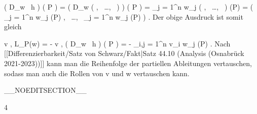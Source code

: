 {\mavergleichskettealignhandlinks
{\vergleichskettealignhandlinks
{ \left(  D_{w}
 \,  h   \right) \left(   P   \right)
}
{ =} { \left(  D_{w}  \left(  {  }   , \,   \ldots  , \,   {  }                 \right)    \right) \left(   P   \right)
}
{ =} { \sum_{j = 1}^n  w_j  {  }  \left(  {  }   , \,   \ldots  , \,   {  }                 \right) (P)
}
{ =} { \left(  \sum_{j = 1}^n  w_j  {  }  {  } (P)   , \,   \ldots  , \,   \sum_{j = 1}^n  w_j  {  }  {  } (P)                 \right)
}
{ } {
}
}
{}
{}{.}
Der obige Ausdruck ist somit gleich

\mavergleichskettealign
{\vergleichskettealign
{ \left\langle  v  ,  L_P(w)  \right\rangle
}
{ =} { - {  } \left\langle  v  ,  \left(  D_{w}
 \,  h   \right) \left(   P   \right)   \right\rangle
}
{ =} { -  {  }  \sum_{i,j = 1}^n v_i  w_j  {  } {  }  (P)
}
{ } {
}
{ } {
}
}
{}
{}{.}
Nach
[[Differenzierbarkeit/Satz von Schwarz/Fakt|Satz 44.10 (Analysis (Osnabrück 2021-2023))]]
kann man die Reihenfolge der partiellen Ableitungen vertauschen, sodass man auch die Rollen von
\mathkor {} {v} {und} {w} {}
vertauschen kann.

 }

__NOEDITSECTION__

{4}

